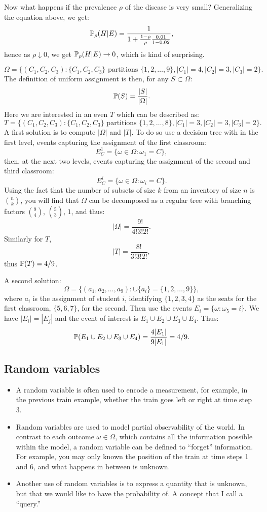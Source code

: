 \documentclass{article}
\begin{document}
Now what happens if the prevalence $\rho$ of the disease is very small? Generalizing the equation above, we get:
\[ \P_\rho(H|E) = \frac{1}{1 + \frac{1-\rho}{\rho}\frac{0.01}{1 - 0.02}}, \]
hence as $\rho \downarrow 0$, we get $\P_\rho(H|E) \to 0$, which is kind of surprising.

\[ \Omega = \{(C_1, C_2, C_3):\{C_1, C_2, C_3\} \text{ partitions }\{1, 2, \dots, 9\}, |C_1| = 4, |C_2| = 3, |C_3| = 2\}. \]
The definition of uniform assignment is then, for any $S \subset \Omega$:
\[ \P(S) = \frac{|S|}{|\Omega|}. \]
Here we are interested in an even $T$ which can be described as:
\[ T = \{(C_1, C_2, C_3):\{C_1, C_2, C_3\} \text{ partitions }\{1, 2, \dots, 8\}, |C_1| = 3, |C_2| = 3, |C_3| = 2\}.  \]
A first solution is to compute $|\Omega|$ and $|T|$. 
To do so use a decision tree with in the first level, events capturing the assignment of the first classroom:
\[ E^1_C = \{\omega \in \Omega : \omega_1 = C\}, \]
then, at the next two levels, events capturing the assignment of the second and third classroom:
\[ E^i_C = \{\omega \in \Omega : \omega_i = C\}. \]
Using the fact that the number of subsets of size $k$ from an inventory of size $n$ is $\binom{n}{k}$, you will find that $\Omega$ can be decomposed as a regular tree with branching factors $\binom{9}{4}$, $\binom{5}{3}$, $1$, and thus:
\[ |\Omega| = \frac{9!}{4! 3! 2!}. \]
Similarly for $T$, 
\[ |T| = \frac{8!}{3! 3! 2!}, \]
thus $\P(T) = 4/9$.

A second solution:
\[ \Omega = \{(a_1, a_2, \dots, a_9) : \cup \{a_i\} = \{1, 2, \dots, 9\}\}, \]
where $a_i$ is the assignment of student $i$, identifying $\{1, 2, 3, 4\}$ as the seats for the first classroom, $\{5, 6, 7\}$, for the second. Then use the events $E_i = \{\omega : \omega_5 = i\}$. We have $|E_i| = |E_j|$ and the event of interest is $E_1 \cup E_2 \cup E_3 \cup E_4$. Thus:
\[ \P(E_1 \cup E_2 \cup E_3 \cup E_4) = \frac{4 |E_1|}{9 |E_1|} = 4/9. \]


\subsection{Random variables}

\begin{itemize}
  \item A random variable is often used to encode a measurement, for example, in the previous train example, whether the train goes left or right at time step 3.
  \item Random variables are used to model partial observability of the world. In contrast to each outcome $\omega \in \Omega$, which contains all the information possible within the model, a random variable can be defined to ``forget'' information. For example, you may only known the position of the train at time steps 1 and 6, and what happens in between is unknown.
  \item Another use of random variables is to express a quantity that is unknown, but that we would like to have the probability of. A concept that I call a ``query.''
\end{itemize}
\end{document}
